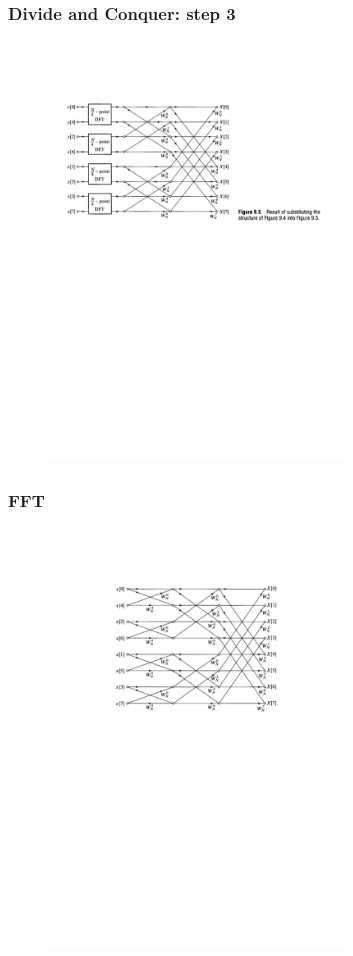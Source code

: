 \begin{frame}
\frametitle{Divide and Conquer: step 3}
\begin{figure}
  \centering
  \includegraphics[width=0.7\textwidth]{FFT2stages}\\
\end{figure}
\end{frame}

\begin{frame}
\frametitle{FFT}
\begin{figure}
  \centering
  \includegraphics[width=0.7\textwidth]{FFTfull}\\
\end{figure}
\end{frame}



 